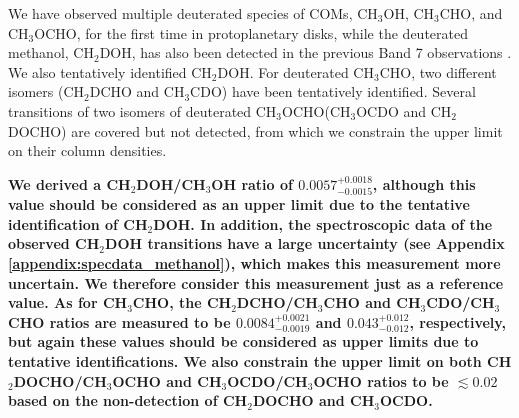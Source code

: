 \documentclass[linenumbers, twocolumn, twocolappendix, astrosymb, times]{aastex631}
\newcommand{\methanol}{CH$_3$OH\xspace}
\newcommand{\acetaldehyde}{CH$_3$CHO\xspace}
\newcommand{\methylformate}{CH$_3$OCHO\xspace}
\begin{document}
We have observed multiple deuterated species of COMs, \methanol, \acetaldehyde, and \methylformate, for the first time in protoplanetary disks, while the deuterated methanol, CH$_2$DOH, has also been detected in the previous Band 7 observations \citep{Lee2019}. We also tentatively identified CH$_2$DOH. For deuterated \acetaldehyde, two different isomers (CH$_2$DCHO and CH$_3$CDO) have been tentatively identified. Several transitions of two isomers of deuterated \methylformate (CH$_3$OCDO and CH$_2$DOCHO) are covered but not detected, from which we constrain the upper limit on their column densities. 

\textbf{We derived a CH$_2$DOH/CH$_3$OH ratio of $0.0057_{-0.0015}^{+0.0018}$, although this value should be considered as an upper limit due to the tentative identification of CH$_2$DOH. In addition, the spectroscopic data of the observed CH$_2$DOH transitions have a large uncertainty (see Appendix \ref{appendix:specdata_methanol}), which makes this measurement more uncertain. We therefore consider this measurement just as a reference value. As for \acetaldehyde, the CH$_2$DCHO/\acetaldehyde and CH$_3$CDO/\acetaldehyde ratios are measured to be $0.0084_{-0.0019}^{+0.0021}$ and $0.043_{-0.012}^{+0.012}$, respectively, but again these values should be considered as upper limits due to tentative identifications. We also constrain the upper limit on both CH$_2$DOCHO/\methylformate and CH$_3$OCDO/\methylformate ratios to be $\lesssim0.02$ based on the non-detection of CH$_2$DOCHO and CH$_3$OCDO.}
\end{document}
